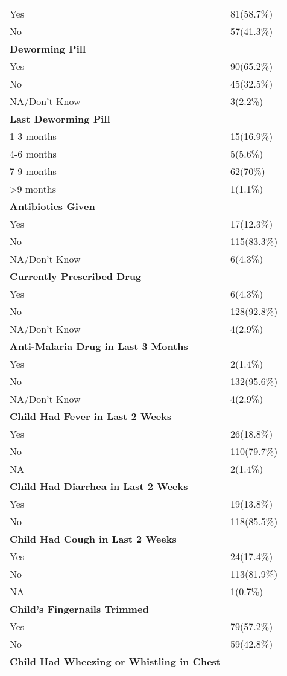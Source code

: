 \documentclass[10pt,letterpaper]{article}
\begin{document}
\begin{longtable}{ll}
Yes & 81(58.7\%) \\
No & 57(41.3\%) \\
\midrule
\textbf{Deworming Pill} & \\
Yes & 90(65.2\%) \\
No & 45(32.5\%) \\
NA/Don't Know & 3(2.2\%) \\
\midrule
\textbf{Last Deworming Pill} & \\
1-3 months & 15(16.9\%) \\
4-6 months & 5(5.6\%) \\
7-9 months & 62(70\%) \\
\textgreater 9 months & 1(1.1\%) \\
\midrule
\textbf{Antibiotics Given} & \\
Yes & 17(12.3\%) \\
No & 115(83.3\%) \\
NA/Don't Know & 6(4.3\%) \\
\midrule
\textbf{Currently Prescribed Drug} & \\
Yes & 6(4.3\%) \\
No & 128(92.8\%) \\
NA/Don't Know & 4(2.9\%) \\
\midrule
\textbf{Anti-Malaria Drug in Last 3 Months} & \\
Yes & 2(1.4\%) \\
No & 132(95.6\%) \\
NA/Don't Know & 4(2.9\%) \\
\midrule
\textbf{Child Had Fever in Last 2 Weeks} & \\
Yes & 26(18.8\%) \\
No & 110(79.7\%) \\
NA & 2(1.4\%) \\
\midrule
\textbf{Child Had Diarrhea in Last 2 Weeks} & \\
Yes & 19(13.8\%) \\
No & 118(85.5\%) \\
\midrule
\textbf{Child Had Cough in Last 2 Weeks} & \\
Yes & 24(17.4\%) \\
No & 113(81.9\%) \\
NA & 1(0.7\%) \\
\midrule
\textbf{Child's Fingernails Trimmed} & \\
Yes & 79(57.2\%) \\
No & 59(42.8\%) \\
\midrule
\textbf{Child Had Wheezing or Whistling in Chest} & \\

\end{longtable}
\end{document}
